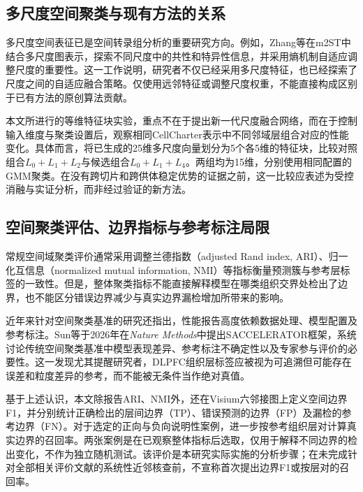 \documentclass[UTF8,a4paper,12pt]{ctexart}
\begin{document}
\subsection{多尺度空间聚类与现有方法的关系}
多尺度空间表征已是空间转录组分析的重要研究方向。例如，Zhang等在m2ST中结合多尺度图表示，探索不同尺度中的共性和特异性信息，并采用熵机制自适应调整尺度的重要性\cite{zhang2025}。这一工作说明，研究者不仅已经采用多尺度特征，也已经探索了尺度之间的自适应融合策略。仅使用远邻特征或调整尺度权重，不能直接构成区别于已有方法的原创算法贡献。

本文所进行的等维特征块实验，重点不在于提出新一代尺度融合网络，而在于控制输入维度与聚类设置后，观察相同CellCharter表示中不同邻域层组合对应的性能变化。具体而言，将已生成的25维多尺度向量划分为5个各5维的特征块，比较对照组合$L_0+L_1+L_2$与候选组合$L_0+L_1+L_4$。两组均为15维，分别使用相同配置的GMM聚类。在没有跨切片和跨供体稳定优势的证据之前，这一比较应表述为受控消融与实证分析，而非经过验证的新方法。

\subsection{空间聚类评估、边界指标与参考标注局限}
常规空间域聚类评价通常采用调整兰德指数（adjusted Rand index, ARI）、归一化互信息（normalized mutual information, NMI）等指标衡量预测簇与参考层标签的一致性。但是，整体聚类指标不能直接解释模型在哪类组织交界处检出了边界，也不能区分错误边界减少与真实边界漏检增加所带来的影响。

近年来针对空间聚类基准的研究还指出，性能报告高度依赖数据处理、模型配置及参考标注。Sun等于2026年在\textit{Nature Methods}中提出SACCELERATOR框架，系统讨论传统空间聚类基准中模型表现差异、参考标注不确定性以及专家参与评价的必要性\cite{sun2026}。这一发现尤其提醒研究者，DLPFC组织层标签应被视为可追溯但可能存在误差和粒度差异的参考，而不能被无条件当作绝对真值。

基于上述认识，本文除报告ARI、NMI外，还在Visium六邻接图上定义空间边界F1，并分别统计正确检出的层间边界（TP）、错误预测的边界（FP）及漏检的参考边界（FN）。对于选定的正向与负向说明性案例，进一步按参考组织层对计算真实边界的召回率。两张案例是在已观察整体指标后选取，仅用于解释不同边界的检出变化，不作为独立随机测试。该评价是本研究实际实施的分析步骤；在未完成针对全部相关评价文献的系统性近邻核查前，不宣称首次提出边界F1或按层对的召回率。
\end{document}
